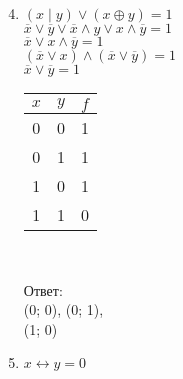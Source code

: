 \begin{spacing}{1.5}
        \begin{minipage}[t]{0.35\textwidth}
            \begin{enumerate}
                \setcounter{enumi}{3}
                \item $(x \mid y) \vee (x \oplus y) = 1$\\
                $\overline x \vee \overline y \vee \overline x \wedge y \vee x \wedge \overline y = 1$\\
                $\overline x \vee x \wedge \overline y = 1$\\
                $(\overline x \vee x) \wedge (\overline x \vee \overline y) = 1$\\
                $\overline x \vee \overline y = 1$
                \begin{spacing}{1}
                    \begin{tabular}{|c|c|c|}
                        \hline
                        $x$ & $y$ & $f$ \\
                        \hline
                        0   & 0   & 1   \\
                        \hline
                        0   & 1   & 1   \\
                        \hline
                        1   & 0   & 1   \\
                        \hline
                        1   & 1   & 0   \\
                        \hline
                    \end{tabular}\\
                \end{spacing}
                Ответ: \\(0; 0), (0; 1), \\(1; 0)
            \end{enumerate}
        \end{minipage}
        \begin{minipage}[t]{0.2\textwidth}
            \begin{enumerate}
                \setcounter{enumi}{4}
                \item $x \leftrightarrow y = 0$\\
                \begin{spacing}{6.2}\end{spacing}
                \begin{spacing}{1}
                    \begin{tabular}{|c|c|c|}
                        \hline

\end{tabular}
\end{spacing}
\end{enumerate}
\end{minipage}
\end{spacing}
